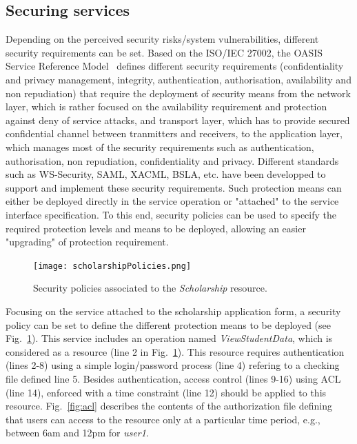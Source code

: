 \documentclass[runningheads,a4paper]{llncs}
\begin{document}
\subsection{Securing services}
Depending on the perceived security risks/system vulnerabilities, different security requirements can be set. Based on the ISO/IEC 27002, the OASIS Service Reference Model~\cite{OAS06} defines different security requirements (confidentiality and privacy management, integrity, authentication, authorisation, availability and non repudiation) that require the deployment of security means from the network layer, which is rather focused on the availability requirement and protection against deny of service attacks, and transport layer, which has to provide secured confidential channel between tranmitters and receivers, to the application layer, which manages most of the security requirements such as authentication, authorisation, non repudiation, confidentiality and privacy. Different standards such as WS-Security, SAML, XACML, BSLA, etc. have been developped to support and implement these security requirements.
Such protection means can either be deployed directly in the service operation or "attached" to the service interface specification. To this end, security policies can be used to specify the required protection levels and means to be deployed, allowing an easier "upgrading" of protection requirement. 



\begin{figure}  
\centering
\texttt{[image: scholarshipPolicies.png]}
\caption{Security policies associated to the \textit{Scholarship}  resource.}
\label{fig:policy}
\end{figure}

Focusing on the service attached to the scholarship application form, a security policy can be set to define the different protection means to be deployed (see Fig.~\ref{fig:policy}). This service includes an operation named \textit{ViewStudentData}, which is considered as a resource (line 2 in
Fig.~\ref{fig:policy}). This resource requires authentication (lines 2-8) using a simple login/password process (line 4) refering to a checking file defined line 5. Besides authentication, access control (lines 9-16) using ACL (line 14), enforced with a time constraint (line 12) should be applied to this resource. Fig.~\ref{fig:acl} describes the contents of the authorization file defining that users can access to the resource only at a particular time period, e.g., between 6am and 12pm for \textit{user1}.
 
\end{document}
